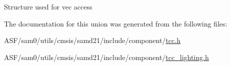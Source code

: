 Structure used for vec access 

The documentation for this union was generated from the following files\+:\begin{DoxyCompactItemize}
\item 
A\+S\+F/sam0/utils/cmsis/samd21/include/component/\mbox{\hyperlink{tcc_8h}{tcc.\+h}}\item 
A\+S\+F/sam0/utils/cmsis/samd21/include/component/\mbox{\hyperlink{tcc__lighting_8h}{tcc\+\_\+lighting.\+h}}\end{DoxyCompactItemize}
